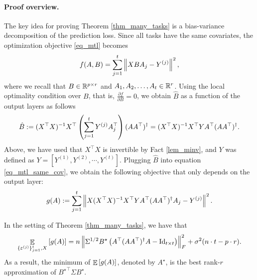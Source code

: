 	\paragraph{Proof overview.} The key idea for proving Theorem \ref{thm_many_tasks} is a bias-variance decomposition of the prediction loss.
	Since all tasks have the same covariates, the optimization objective \eqref{eq_mtl} becomes
	\begin{align}
		f(A, B) = \sum_{j=1}^t \left\| X B A_j - Y^{(j)} \right\|^2, \label{eq_mtl_same_cov}
	\end{align}
	where we recall that $B \in \mathbb{R}^{p \times r}$ and $A_1, A_2, \dots, A_t \in \mathbb{R}^r$.
	Using the local optimality condition over $B$, that is, $\frac{\partial f}{\partial B} = 0$, we obtain $\hat{B}$ as a function of the output layers as follows
	\begin{align} \label{eq_Bhat}
		\hat{B} := (X^{\top}X)^{-1} X^{\top} \left({\sum_{j=1}^t Y^{(j)} A_j^{\top}}\right) (A  A^{\top})^{\dagger}
		= (X^{\top} X)^{-1} X^{\top} Y A^{\top} (AA^{\top})^{\dagger}.
	\end{align}
	Above, we have used that $X^{\top}X$ is invertible by Fact \ref{lem_minv}, and $Y$ was defined as $Y=[Y^{(1)},Y^{(2)},\cdots, Y^{(t)}]$. 
	Plugging $\hat{B}$ into equation \eqref{eq_mtl_same_cov}, we obtain the following objective that only depends on the output layer:
	\begin{align}
		g(A) := \sum_{j=1}^t \left\| X (X^{\top}X)^{-1}X^{\top} Y A^{\top} (AA^{\top})^{\dagger} A_j - Y^{(j)} \right\|^2. \label{eq_mtl_output_layer}
	\end{align}

	\begin{claim}\label{lem_exp_opt}
		In the setting of Theorem \ref{thm_many_tasks}, we have that
		\begin{align}
			\mathop{\mathbb{E}}_{\{\varepsilon^{(j)}\}_{j=1}^t, X}\left[ g(A) \right] = n \left\| \Sigma^{1/2} B^{\star} \left({A^{\top} (AA^{\top})^{\dagger} A - \operatorname{Id}_{t\times t}}\right) \right\|_{F}^2 + \sigma^2 (n\cdot t - p \cdot r). \label{eq_gA}
		\end{align}
		As a result, the minimum of $\mathop{\mathbb{E}}\left[ g(A) \right]$, denoted by $A^{\star}$, is the best rank-$r$ approximation of ${B^{\star}}^{\top}\Sigma B^{\star}$.
	\end{claim}

